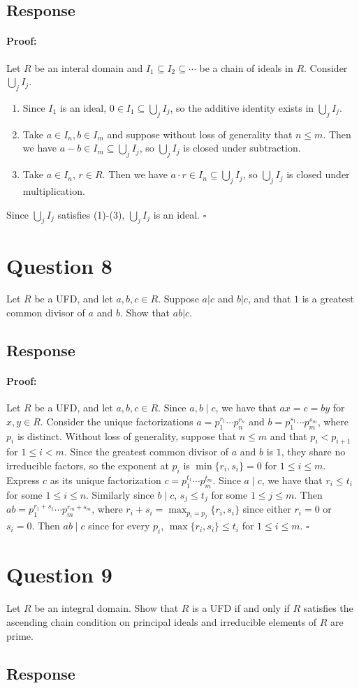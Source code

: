 \documentclass [12pt] {article}
\newenvironment{proof}{\paragraph{Proof:}}{\hfill$\square$}
\begin{document}
\subsection*{Response}
\begin{proof}
    Let $R$ be an interal domain and $I_1 \subseteq I_2 \subseteq \cdots$ be a chain of ideals in
    $R$. Consider $\bigcup_j I_j$.
    \begin{enumerate}
        \item Since $I_1$ is an ideal, $0 \in I_1 \subseteq \bigcup_j I_j$, so the additive identity
            exists in $\bigcup_j I_j$.
        \item Take $a \in I_n, b \in I_m$ and suppose without loss of generality that $n \leq m$.
            Then we have $a - b \in I_m \subseteq \bigcup_j I_j$, so $\bigcup_j I_j$ is closed under
            subtraction.
        \item Take $a \in I_n$, $r \in R$. Then we have $a \cdot r \in I_n \subseteq \bigcup_j I_j$,
            so $\bigcup_j I_j$ is closed under multiplication.
    \end{enumerate}
    Since $\bigcup_j I_j$ satisfies (1)-(3), $\bigcup_j I_j$ is an ideal.
\end{proof}
\newpage

\section*{Question 8}
Let $R$ be a UFD, and let $a,b,c\in R$. Suppose $a|c$ and $b|c$, and that $1$ is a greatest common
divisor of $a$ and $b$. Show that $ab|c$.
\subsection*{Response}
\begin{proof}
    Let $R$ be a UFD, and let $a, b, c \in R$. Since $a, b \mid c$, we have that $ax = c = by$ for
    $x, y \in R$. Consider the unique factorizations $a = p_1^{r_1} \cdots p_n^{r_n}$ and
    $b = p_1^{s_1} \cdots p_m^{s_m}$, where $p_i$ is distinct. Without loss of generality, suppose
    that $n \leq m$ and that $p_i < p_{i + 1}$ for $1 \leq i < m$.
    Since the greatest common divisor of $a$ and $b$ is $1$, they share no irreducible factors, so
    the exponent at $p_i$ is $\min\{ r_i, s_i \} = 0$ for $1 \leq i \leq m$. Express $c$ as its
    unique factorization $c = p_1^{t_1} \cdots p_m^{t_m}$. Since $a \mid c$, we have that
    $r_i \leq t_i$ for some $1 \leq i \leq n$. Similarly since $b \mid c$, $s_j \leq t_j$ for some
    $1 \leq j \leq m$. Then $ab = p_1^{r_1 + s_1} \cdots p_m^{r_m + s_m}$, where
    $r_i + s_i = \max_{p_i = p_j} \{ r_i, s_i \}$ since either $r_i = 0$ or $s_i = 0$. Then
    $ab \mid c$ since for every $p_i$, $\max\{r_i, s_i\} \leq t_i$ for $1 \leq i \leq m$.
\end{proof}
\newpage

\section*{Question 9}
Let $R$ be an integral domain. Show that $R$ is a UFD if and only if $R$ satisfies the ascending
chain condition on principal ideals and irreducible elements of $R$ are prime.
\subsection*{Response}
\newpage
\end{document}
